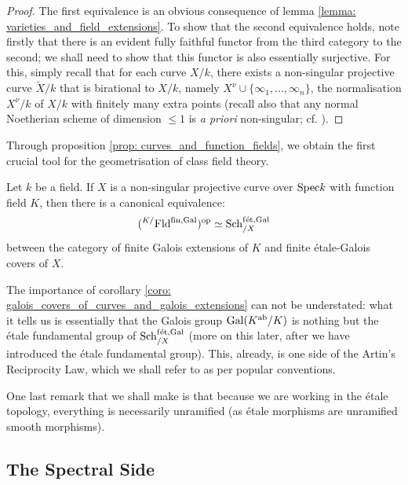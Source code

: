                 \begin{proof}
                    The first equivalence is an obvious consequence of lemma \ref{lemma: varieties_and_field_extensions}. To show that the second equivalence holds, note firstly that there is an evident fully faithful functor from the third category to the second; we shall need to show that this functor is also essentially surjective. For this, simply recall that for each curve $X/k$, there exists a non-singular projective curve $\tilde{X}/k$ that is birational to $X/k$, namely $X^{\nu} \cup \{\infty_1, ..., \infty_n\}$, the normalisation $X^{\nu}/k$ of $X/k$ with finitely many extra points (recall also that any normal Noetherian scheme of dimension $\leq 1$ is \textit{a priori} non-singular; cf. \cite[\href{https://stacks.math.columbia.edu/tag/0BX2}{Tag 0BX2}]{stacks}).
                \end{proof}
                
            Through proposition \ref{prop: curves_and_function_fields}, we obtain the first crucial tool for the geometrisation of class field theory.
            \begin{corollary} \label{coro: galois_covers_of_curves_and_galois_extensions}
                Let $k$ be a field. If $X$ is a non-singular projective curve over $\mathrm{Spec} k$ with function field $K$, then there is a canonical equivalence:
                    $$({}^{K/}\mathrm{Fld}^{\mathrm{fin}, \mathrm{Gal}})^{\mathrm{op}} \simeq \mathrm{Sch}_{/X}^{\mathrm{f\acute{e}t}, \mathrm{Gal}}$$
                between the category of finite Galois extensions of $K$ and finite \'etale-Galois covers of $X$. 
            \end{corollary}
            The importance of corollary \ref{coro: galois_covers_of_curves_and_galois_extensions} can not be understated: what it tells us is essentially that the Galois group $\mathrm{Gal}(K^{\mathrm{ab}}/K)$ is nothing but the \'etale fundamental group of $\mathrm{Sch}_{/X}^{\mathrm{f\acute{e}t}, \mathrm{Gal}}$ (more on this later, after we have introduced the \'etale fundamental group). This, already, is one side of the Artin's Reciprocity Law, which we shall refer to as  per popular conventions.
            
            One last remark that we shall make is that because we are working in the \'etale topology, everything is necessarily unramified (as \'etale morphisms are unramified smooth morphisms).
        
        \subsection{The Spectral Side}
    
